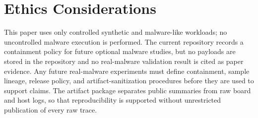\section*{Ethics Considerations}

This paper uses only controlled synthetic and malware-like workloads; no
uncontrolled malware execution is performed. The current repository records a
containment policy for future optional malware studies, but no payloads are
stored in the repository and no real-malware validation result is cited as paper
evidence. Any future real-malware experiments must define containment, sample
lineage, release policy, and artifact-sanitization procedures before they are
used to support claims. The artifact package separates public summaries from raw
board and host logs, so that reproducibility is supported without unrestricted
publication of every raw trace.
